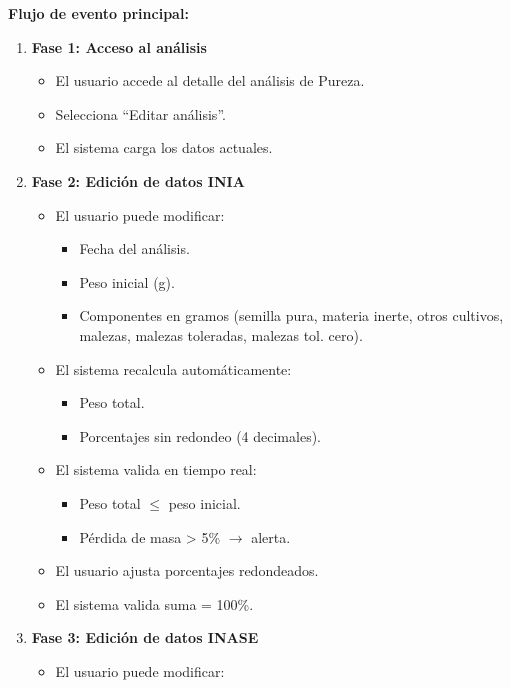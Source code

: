\vspace{0.5em}
\noindent\textbf{Flujo de evento principal:}
\begin{enumerate}[nosep]
    \item \textbf{Fase 1: Acceso al análisis}
    \begin{itemize}[nosep]
        \item El usuario accede al detalle del análisis de Pureza.
        \item Selecciona ``Editar análisis''.
        \item El sistema carga los datos actuales.
    \end{itemize}
    \item \textbf{Fase 2: Edición de datos INIA}
    \begin{itemize}[nosep]
        \item El usuario puede modificar:
        \begin{itemize}[nosep]
            \item Fecha del análisis.
            \item Peso inicial (g).
            \item Componentes en gramos (semilla pura, materia inerte, otros cultivos, malezas, malezas toleradas, malezas tol. cero).
        \end{itemize}
        \item El sistema recalcula automáticamente:
        \begin{itemize}[nosep]
            \item Peso total.
            \item Porcentajes sin redondeo (4 decimales).
        \end{itemize}
        \item El sistema valida en tiempo real:
        \begin{itemize}[nosep]
            \item Peso total $\leq$ peso inicial.
            \item Pérdida de masa > 5\% $\rightarrow$ alerta.
        \end{itemize}
        \item El usuario ajusta porcentajes redondeados.
        \item El sistema valida suma = 100\%.
    \end{itemize}
    \item \textbf{Fase 3: Edición de datos INASE}
    \begin{itemize}[nosep]
        \item El usuario puede modificar:

\end{itemize}
\end{enumerate}
